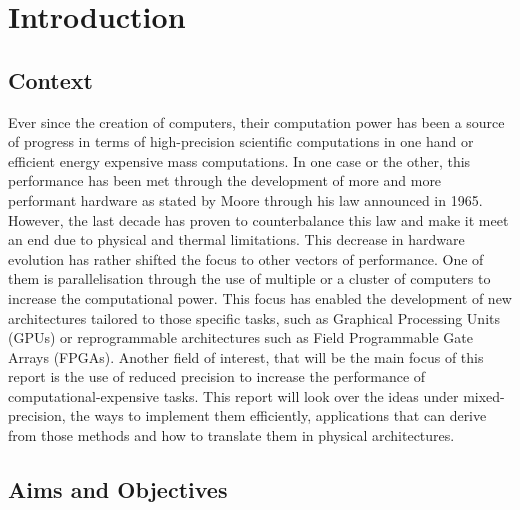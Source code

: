 \chapter{Introduction}\label{chap_intro} %

\label{Chapter1} %



\section{Context}

Ever since the creation of computers, their computation power has been a source of progress in terms of high-precision scientific computations in one hand or efficient energy expensive mass computations. In one case or the other, this performance has been met through the development of more and more performant hardware as stated by Moore through his law announced in 1965. However, the last decade has proven to counterbalance this law and make it meet an end due to physical and thermal limitations. This decrease in hardware evolution has rather shifted the focus to other vectors of performance. One of them is parallelisation through the use of multiple or a cluster of computers to increase the computational power. This focus has enabled the development of new architectures tailored to those specific tasks, such as Graphical Processing Units (GPUs) or reprogrammable architectures such as Field Programmable Gate Arrays (FPGAs). Another field of interest, that will be the main focus of this report is the use of reduced precision to increase the performance of computational-expensive tasks. This report will look over the ideas under mixed-precision, the ways to implement them efficiently, applications that can derive from those methods and how to translate them in physical architectures.

\section{Aims and Objectives}

